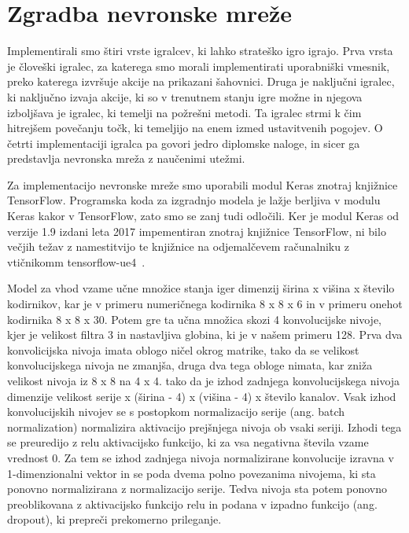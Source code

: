 \documentclass[a4paper, 12pt]{book}
\begin{document}
\section{Zgradba nevronske mreže}
Implementirali smo štiri vrste igralcev, ki lahko strateško igro igrajo.
Prva vrsta je človeški igralec, za katerega smo morali implementirati uporabniški vmesnik, preko katerega izvršuje akcije na prikazani šahovnici.
Druga je naključni igralec, ki naključno izvaja akcije, ki so v trenutnem stanju igre možne in njegova izboljšava je igralec, ki temelji na požrešni metodi.
Ta igralec strmi k čim hitrejšem povečanju točk, ki temeljijo na enem izmed ustavitvenih pogojev.
O četrti implementaciji igralca pa govori jedro diplomske naloge, in sicer ga predstavlja nevronska mreža z naučenimi utežmi.

Za implementacijo nevronske mreže smo uporabili modul Keras znotraj knjižnice TensorFlow.
Programska koda za izgradnjo modela je lažje berljiva v modulu Keras kakor v TensorFlow, zato smo se zanj tudi odločili.
Ker je modul Keras od verzije 1.9 izdani leta 2017 impementiran znotraj knjižnice TensorFlow, ni bilo večjih težav z namestitvijo te knjižnice na odjemalčevem računalniku z vtičnikomm tensorflow-ue4~\cite{ue4tf}.

Model za vhod vzame učne množice stanja iger dimenzij širina x višina x število kodirnikov, kar je v primeru numeričnega kodirnika 8 x 8 x 6 in v primeru onehot kodirnika 8 x 8 x 30.
Potem gre ta učna množica skozi 4 konvolucijske nivoje, kjer je velikost filtra 3 in nastavljiva globina, ki je v našem primeru 128.
Prva dva konvolicijska nivoja imata oblogo ničel okrog matrike, tako da se velikost konvolucijskega nivoja ne zmanjša, druga dva tega obloge nimata, kar zniža velikost nivoja iz 8 x 8 na 4 x 4.
tako da je izhod zadnjega konvolucijskega nivoja dimenzije velikost serije x (širina - 4) x (višina - 4) x število kanalov.
Vsak izhod konvolucijskih nivojev se s postopkom normalizacijo serije (ang. batch normalization) normalizira aktivacijo prejšnjega nivoja ob vsaki seriji.
Izhodi tega se preuredijo z relu aktivacijsko funkcijo, ki za vsa negativna števila vzame vrednost 0.
Za tem se izhod zadnjega nivoja normalizirane konvolucije izravna v 1-dimenzionalni vektor in se poda dvema polno povezanima nivojema, ki sta ponovno normalizirana z normalizacijo serije.
Tedva nivoja sta potem ponovno preoblikovana z aktivacijsko funkcijo relu in podana v izpadno funkcijo (ang. dropout), ki prepreči prekomerno prileganje.
\end{document}

